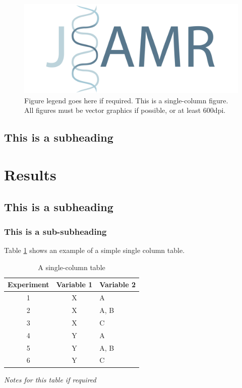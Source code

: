 \documentclass[paper=a4,fontsize=11pt,twocolumn]{article}
\begin{document}
\begin{figure}
\centering
\includegraphics[width=\columnwidth]{logo-wide-jsamr.pdf}
\caption{Figure legend goes here if required. This is a single-column figure. All figures must be vector graphics if possible, or at least 600dpi.}
\label{fig:one-column}
\end{figure}

\lipsum[8-9]

\subsection{This is a subheading}
\lipsum[10-11]
\cite {Burns1981}

\section{Results}
\subsection{This is a subheading}
\subsubsection{This is a sub-subheading}

Table \ref{tab:one-column} shows an example of a simple single column table.

\begin{table}
\begin{centering}
\caption{A single-column table}\label{tab:one-column}
	\begin{tabular}[\columnwidth]{ccl}\toprule
		Experiment &  Variable 1 &  Variable 2 \\
		\midrule
		1  & X & A \\
		2  & X & A, B \\
		3  & X & C \\
		4  & Y & A \\
		5  & Y & A, B \\
		6  & Y & C \\
		\bottomrule
	\end{tabular}\par
	\medskip
\textit{Notes for this table if required}
\end{centering}
\end{table}
\end{document}
